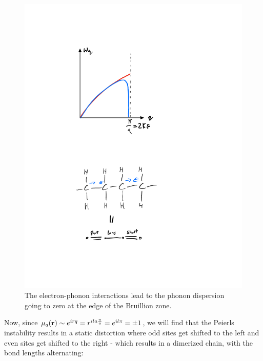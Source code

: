 \begin{figure}[htbp]
    \centering
    \includegraphics[scale=0.6]{Images/fig-polyacepeierls.pdf}
    \caption{The electron-phonon interactions lead to the phonon dispersion going to zero at the edge of the Bruillion zone.}
    \label{fig-polyacepeierls}
\end{figure}

\newpage 
Now, since $\mu_q(\mathbf{r}) \sim e^{irq} = r^{ila\frac{\pi}{a}} = e^{il\pi} = \pm 1$, we will find that the Peierls instability results in a static distortion where odd sites get shifted to the left and even sites get shifted to the right - which results in a dimerized chain, with the bond lengths alternating:

